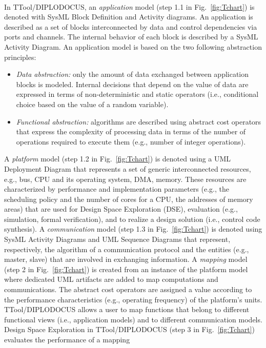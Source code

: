 \documentclass{llncs}
\begin{document}
%
\\In TTool/DIPLODOCUS, an \textit{application} model (step 1.1 in Fig.~\ref{fig:Tchart}) is denoted with SysML Block
Definition and Activity diagrams. An application is described as a set of blocks interconnected by data and control
dependencies via ports and channels. The internal behavior of each block is described by a SysML Activity Diagram. An
application model is based on the two following abstraction principles:
%
\begin{itemize}
	\item \emph{Data abstraction:} only the amount of data exchanged between application blocks is modeled. Internal
	decisions that depend on the value of data are expressed in terms of non-deterministic and static operators (i.e.,
	conditional choice based on the value of a random variable).
	\item \emph{Functional abstraction:} algorithms are described using abstract cost operators that express the
	complexity of processing data in terms of the number of operations required to execute them (e.g., number of integer
	operations).
\end{itemize}
%
A \textit{platform} model (step 1.2 in Fig.~\ref{fig:Tchart}) is denoted using a UML Deployment Diagram that represents
a set of generic interconnected resources, e.g., bus, CPU and its operating system, DMA, memory. These resources are
characterized by performance and implementation parameters (e.g., the scheduling policy and the number of cores for a
CPU, the addresses of memory areas) that are used for Design Space Exploration (DSE), evaluation (e.g., simulation, formal
verification), and to realize a design solution (i.e., control code synthesis). A \textit{communication} model (step 1.3
in Fig.~\ref{fig:Tchart}) is denoted using SysML Activity Diagrams and UML Sequence Diagrams that represent,
respectively, the algorithm of a communication protocol and the entities (e.g., master, slave) that are involved in
exchanging information. A \textit{mapping} model (step 2 in Fig.~\ref{fig:Tchart}) is created from an instance of the
platform model where dedicated UML artifacts are added to map computations and communications. The abstract cost
operators are assigned a value according to the performance characteristics (e.g., operating frequency) of the
platform's units. TTool/DIPLODOCUS allows a user to map functions that belong to different functional views (i.e.,
application models) and to different communication models.\\
%
Design Space Exploration in TTool/DIPLODOCUS (step 3 in Fig.~\ref{fig:Tchart}) evaluates the performance of a mapping
\end{document}
